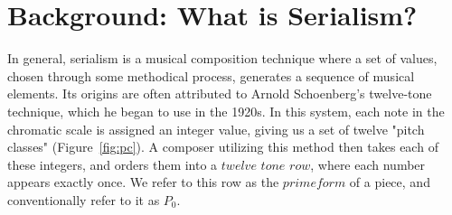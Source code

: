 \section{Background: What is Serialism?}

In general, serialism is a musical composition technique where a set of values, chosen through some methodical process, 
generates a sequence of musical elements. Its origins are often attributed to Arnold Schoenberg's twelve-tone technique, which
he began to use in the 1920s. In this system, each note in the chromatic scale is assigned an integer value, giving us a set of twelve
"pitch classes" (Figure~\ref{fig:pc}).
A composer utilizing this method then takes each of these integers, and orders them into a $twelve$ $tone$ $row$, where 
each number appears exactly once. We refer to this row as the $prime form$ of a piece, and conventionally refer 
to it as $P_0$. 

